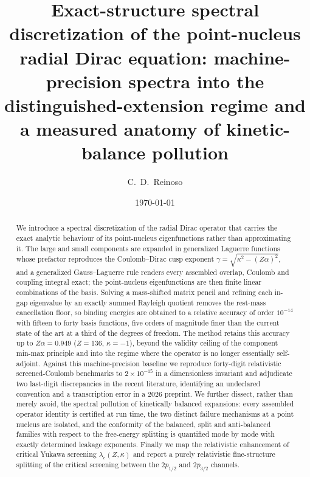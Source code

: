 \documentclass[aps,pra,twocolumn,superscriptaddress,showpacs,floatfix,longbibliography]{revtex4-2}
\newcommand{\Za}{\ensuremath{Z\alpha}}
\begin{document}
\title{Exact-structure spectral discretization of the point-nucleus
radial Dirac equation: machine-precision spectra into the
distinguished-extension regime and a measured anatomy of
kinetic-balance pollution}

\author{C.~D.~Reinoso}

\date{\today}

\begin{abstract}
We introduce a spectral discretization of the radial Dirac operator that
carries the exact analytic behaviour of its point-nucleus eigenfunctions
rather than approximating it. The large and small components are expanded
in generalized Laguerre functions whose prefactor reproduces the
Coulomb--Dirac cusp exponent $\gamma=\sqrt{\kappa^{2}-(\Za)^{2}}$, and a
generalized Gauss--Laguerre rule renders every assembled overlap, Coulomb
and coupling integral exact; the point-nucleus eigenfunctions are then
finite linear combinations of the basis. Solving a mass-shifted matrix
pencil and refining each in-gap eigenvalue by an exactly summed Rayleigh
quotient removes the rest-mass cancellation floor, so binding energies are
obtained to a relative accuracy of order $10^{-14}$ with fifteen to forty
basis functions, five orders of magnitude finer than the current state of
the art at a third of the degrees of freedom. The method retains this
accuracy up to $\Za=0.949$ ($Z=136$, $\kappa=-1$), beyond the validity
ceiling of the component min-max principle and into the regime where the
operator is no longer essentially self-adjoint. Against this
machine-precision baseline we reproduce forty-digit relativistic
screened-Coulomb benchmarks to $2\times10^{-15}$ in a dimensionless
invariant and adjudicate two last-digit discrepancies in the recent
literature, identifying an undeclared convention and a transcription error
in a 2026 preprint. We further dissect, rather than merely avoid, the
spectral pollution of kinetically balanced expansions: every assembled
operator identity is certified at run time, the two distinct failure
mechanisms at a point nucleus are isolated, and the conformity of the
balanced, split and anti-balanced families with respect to the free-energy
splitting is quantified mode by mode with exactly determined leakage
exponents. Finally we map the relativistic enhancement of critical Yukawa
screening $\lambda_{c}(Z,\kappa)$ and report a purely relativistic
fine-structure splitting of the critical screening between the
$2p_{1/2}$ and $2p_{3/2}$ channels.
\end{abstract}
\end{document}
